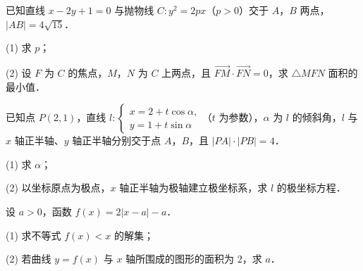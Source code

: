 \begin{question}
已知直线 $x-2y+1=0$ 与抛物线 $C:y^2=2px$（$p>0$）交于 $A$，$B$ 两点，$|AB|=4\sqrt{15}$．

  (1) 求 $p$；

  (2) 设 $F$ 为 $C$ 的焦点，$M$，$N$ 为 $C$ 上两点，且 $\overrightarrow{FM}\cdot\overrightarrow{FN}=0$，求 $\triangle MFN$ 面积的最小值．

\end{question}
\begin{question}
已知点 $P(2,1)$，直线 $l:\begin{cases}x=2+t\cos\alpha,\\y=1+t\sin\alpha\end{cases}$（$t$ 为参数），$\alpha$ 为 $l$ 的倾斜角，$l$ 与 $x$ 轴正半轴、$y$ 轴正半轴分别交于点 $A$，$B$，且 $|PA|\cdot|PB|=4$．

  (1) 求 $\alpha$；

  (2) 以坐标原点为极点，$x$ 轴正半轴为极轴建立极坐标系，求 $l$ 的极坐标方程．

\end{question}
\begin{question}
设 $a>0$，函数 $f(x)=2|x-a|-a$．

  (1) 求不等式 $f(x)<x$ 的解集；

  (2) 若曲线 $y=f(x)$ 与 $x$ 轴所围成的图形的面积为 $2$，求 $a$．

\end{question}
